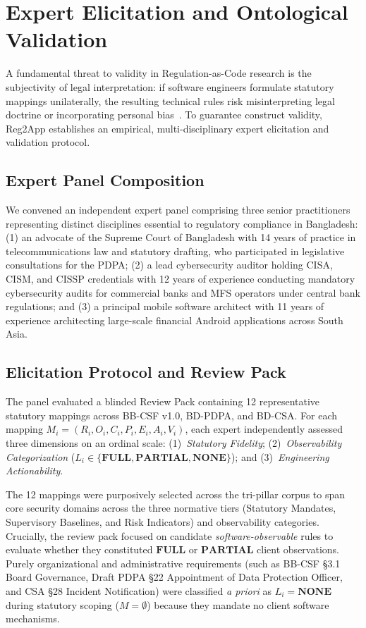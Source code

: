 \section{Expert Elicitation and Ontological Validation}
\label{sec:expert}

A fundamental threat to validity in Regulation-as-Code research is the subjectivity of legal interpretation: if software engineers formulate statutory mappings unilaterally, the resulting technical rules risk misinterpreting legal doctrine or incorporating personal bias~\cite{breaux_requirements}. To guarantee construct validity, Reg2App establishes an empirical, multi-disciplinary expert elicitation and validation protocol.

\subsection{Expert Panel Composition}
\label{sec:expert:panel}

We convened an independent expert panel comprising three senior practitioners representing distinct disciplines essential to regulatory compliance in Bangladesh: (1) an advocate of the Supreme Court of Bangladesh with 14 years of practice in telecommunications law and statutory drafting, who participated in legislative consultations for the PDPA; (2) a lead cybersecurity auditor holding CISA, CISM, and CISSP credentials with 12 years of experience conducting mandatory cybersecurity audits for commercial banks and MFS operators under central bank regulations; and (3) a principal mobile software architect with 11 years of experience architecting large-scale financial Android applications across South Asia.

\subsection{Elicitation Protocol and Review Pack}
\label{sec:expert:protocol}

The panel evaluated a blinded Review Pack containing 12 representative statutory mappings across BB-CSF v1.0, BD-PDPA, and BD-CSA. For each mapping $M_i = (R_i, O_i, C_i, P_i, E_i, A_i, V_i)$, each expert independently assessed three dimensions on an ordinal scale: (1)~\textit{Statutory Fidelity}; (2)~\textit{Observability Categorization} ($L_i \in \{\mathbf{FULL}, \mathbf{PARTIAL}, \mathbf{NONE}\}$); and (3)~\textit{Engineering Actionability}.

The 12 mappings were purposively selected across the tri-pillar corpus to span core security domains across the three normative tiers (Statutory Mandates, Supervisory Baselines, and Risk Indicators) and observability categories. Crucially, the review pack focused on candidate \textit{software-observable} rules to evaluate whether they constituted $\mathbf{FULL}$ or $\mathbf{PARTIAL}$ client observations. Purely organizational and administrative requirements (such as BB-CSF §3.1 Board Governance, Draft PDPA §22 Appointment of Data Protection Officer, and CSA §28 Incident Notification) were classified \textit{a priori} as $L_i = \mathbf{NONE}$ during statutory scoping ($M = \emptyset$) because they mandate no client software mechanisms.

